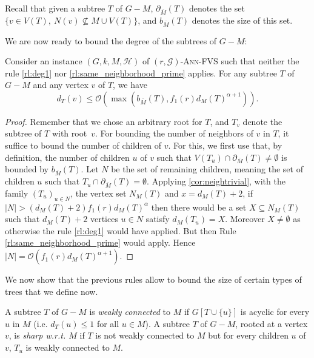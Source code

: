 \documentclass{amsart}
\newcommand{\G}{\mathcal{G}}
\newcommand{\pom}{\partial_{\overline{M}}}
\newcommand{\bom}{b_{\overline{M}}}
\newcommand{\mH}{\mathcal{H}}
\newcommand{\AFVS}{\textsc{$(r,\G)$-Ann-FVS}\xspace}
\newcommand{\ruleref}[1]{\hyperref[#1]{\ref*{#1}}}
\renewcommand{\O}{\mathcal{O}}
\begin{document}
Recall that given a subtree $T$ of $G-M$, $\pom (T)$ denotes the set $\{v\in V(T),~N(v) \not\subseteq M\cup V(T) \}$, and $\bom (T)$ denotes the size of this set.

We are now ready to bound the degree of the subtrees of $G-M$:

\begin{lemma}\label{lem:degree-T}
Consider an instance $(G,k,M,\mH)$ of \AFVS such that neither the rule \ruleref{rl:deg1} nor \ruleref{rl:same_neighborhood_prime} applies.
For any subtree $T$ of $G- M$ and any vertex $v$ of $T$,  we have
\[
d_{T}(v)\le \O(\max(\bom(T),f_1(r)d_M(T)^{\alpha+1})).
\]
\end{lemma}


\begin{proof}
Remember that we chose an arbitrary root for $T$, and $T_v$ denote the subtree of $T$ with root~$v$. For bounding the number of neighbors of $v$ in $T$, it suffice to bound the number of children of $v$. For this, we first use that, by definition, the number of children $u$ of $v$ such that $V(T_u) \cap \pom(T)\neq \emptyset$ is bounded by $\bom(T)$. Let $N$ be the set of remaining children, meaning the set of children $u$ such that $T_u\cap \pom(T) = \emptyset$.
Applying \autoref{cor:neightrivial}, with the family $(T_u)_{u\in N}$, the vertex set $N_M(T)$ and $x=d_M(T)+2$, if $|N| > (d_M(T)+2)f_1(r)d_M(T)^\alpha $ then there would be a set $X\subseteq N_M(T)$ such that $d_M(T)+2$ vertices $u\in N$ satisfy $d_M(T_u)=X$. Moreover $X\neq \emptyset$ as otherwise the rule \ruleref{rl:deg1} would have applied. But then Rule \ruleref{rl:same_neighborhood_prime} would apply.
Hence $|N|=\O(f_1(r) d_M(T)^{\alpha+1})$.
\end{proof}


We now show that the previous rules allow to bound the size of certain types of trees that we define now.

\begin{definition}
A subtree $T$ of $G-M$ is \emph{weakly connected} to $M$ if $G[T\cup \{u\}]$ is acyclic for every $u$ in $M$ (i.e. $d_T(u)\leq 1$ for all $u\in M$).
A subtree $T$ of $G- M$, rooted at a vertex $v$, is \emph{sharp w.r.t. $M$} if $T$ is not weakly connected to $M$ but for every children $u$ of $v$, $T_u$ is weakly connected to $M$.
\end{definition}
\end{document}
